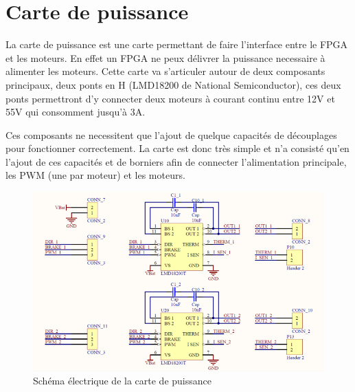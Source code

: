 \section{Carte de puissance}
La carte de puissance est une carte permettant de faire l'interface entre le FPGA et les moteurs. En effet un FPGA ne peux délivrer la puissance necessaire à alimenter les moteurs.
Cette carte va s'articuler autour de deux composants principaux, deux ponts en H (LMD18200 de National Semiconductor), ces deux ponts permettront d'y connecter deux moteurs à
courant continu entre 12V et 55V qui consomment jusqu'à 3A.

Ces composants ne necessitent que l'ajout de quelque capacités de découplages pour fonctionner correctement. La carte est donc très simple et n'a consisté qu'en l'ajout de ces capacités et
de borniers afin de connecter l'alimentation principale, les PWM (une par moteur) et les moteurs.

\begin{figure}[h]
\centering
\includegraphics[width=17cm]{img/Schema_carte_puissance.PNG}
\caption{Schéma électrique de la carte de puissance}
\end{figure}
\pagebreak